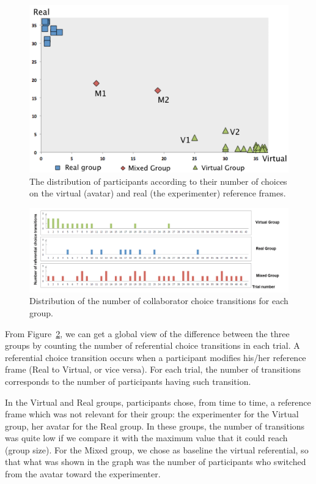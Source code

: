 \begin{figure}[htb]
  \centering
  \includegraphics[width=\textwidth]{figures/ch3/clustering}
  \caption{\label{fig:3_clustering}The distribution of participants according to their number of choices on the virtual (avatar) and real (the experimenter) reference frames.}
\end{figure}

\begin{figure}[htb]
  \centering
  \includegraphics[width=\textwidth]{figures/ch3/transition}
  \caption{\label{fig:3_transition}Distribution of the number of collaborator choice transitions for each group.}
\end{figure}

From Figure~\ref{fig:3_transition}, we can get a global view of the difference between the three groups by counting the number of referential choice transitions in each trial. A referential choice transition occurs when a participant modifies his/her reference frame (Real to Virtual, or vice versa). For each trial, the number of transitions corresponds to the number of participants having such transition.

In the Virtual and Real groups, participants chose, from time to time, a reference frame which was not relevant for their group: the experimenter for the Virtual group, her avatar for the Real group. In these groups, the number of transitions was quite low if we compare it with the maximum value that it could reach (group size). For the Mixed group, we chose as baseline the virtual referential, so that what was shown in the graph was the number of participants who switched from the avatar toward the experimenter.

